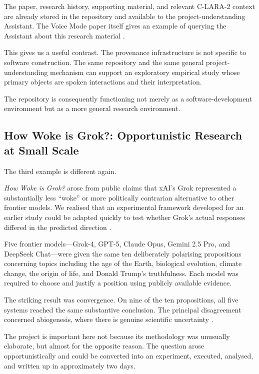 The paper, research history, supporting material, and relevant C-LARA-2 context are already stored in the repository and available to the project-understanding Assistant. The Voice Mode paper itself gives an example of querying the Assistant about this research material \citep{wrightEtAl2026voice}.

This gives us a useful contrast. The provenance infrastructure is not specific to software construction. The same repository and the same general project-understanding mechanism can support an exploratory empirical study whose primary objects are spoken interactions and their interpretation.

The repository is consequently functioning not merely as a software-development environment but as a more general research environment.


\subsection{How Woke is Grok?: Opportunistic Research at Small Scale}

The third example is different again.

\emph{How Woke is Grok?} arose from public claims that xAI's Grok represented a substantially less ``woke'' or more politically contrarian alternative to other frontier models. We realised that an experimental framework developed for an earlier study could be adapted quickly to test whether Grok's actual responses differed in the predicted direction \citep{raynerChatGPT2025grok}.

Five frontier models---Grok-4, GPT-5, Claude Opus, Gemini 2.5 Pro, and DeepSeek Chat---were given the same ten deliberately polarising propositions concerning topics including the age of the Earth, biological evolution, climate change, the origin of life, and Donald Trump's truthfulness. Each model was required to choose and justify a position using publicly available evidence.

The striking result was convergence. On nine of the ten propositions, all five systems reached the same substantive conclusion. The principal disagreement concerned abiogenesis, where there is genuine scientific uncertainty \citep{raynerChatGPT2025grok}.

The project is important here not because its methodology was unusually elaborate, but almost for the opposite reason. The question arose opportunistically and could be converted into an experiment, executed, analysed, and written up in approximately two days.


